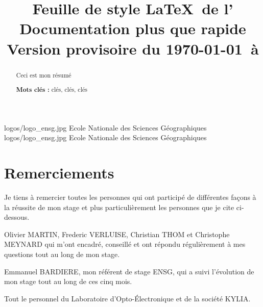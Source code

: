 \documentclass{themeensg}
\title{Feuille de style \LaTeX~de l'\ensg\\Documentation plus que rapide\\Version provisoire du \today~à \timenow}
\begin{document}
\begin{titlepage}
\enterprise 
{logos/logo_ensg.jpg}
{Ecole Nationale des Sciences Géographiques}
{logos/logo_ensg.jpg}
{Ecole Nationale des Sciences Géographiques}


\end{titlepage}




\chapter*{Remerciements}

Je tiens à remercier toutes les personnes qui ont participé de différentes façons à la réussite de mon stage et plus particulièrement les personnes que je cite ci-dessous.

Olivier MARTIN, Frederic VERLUISE, Christian THOM et Christophe MEYNARD qui m'ont encadré, conseillé et ont répondu régulièrement à mes questions tout au long de mon stage.

Emmanuel BARDIERE, mon référent de stage ENSG, qui a suivi l'évolution de mon stage tout au long de ces cinq mois.

Tout le personnel du Laboratoire d'Opto-Électronique et de la société KYLIA.



\begin{abstract}
\thispagestyle{empty}
	\vspace{1cm}

	Ceci est mon résumé
	
	\vspace{1.5cm}
	
	\textbf{Mots clés :} clés, clés, clés
\end{abstract}
\end{document}
